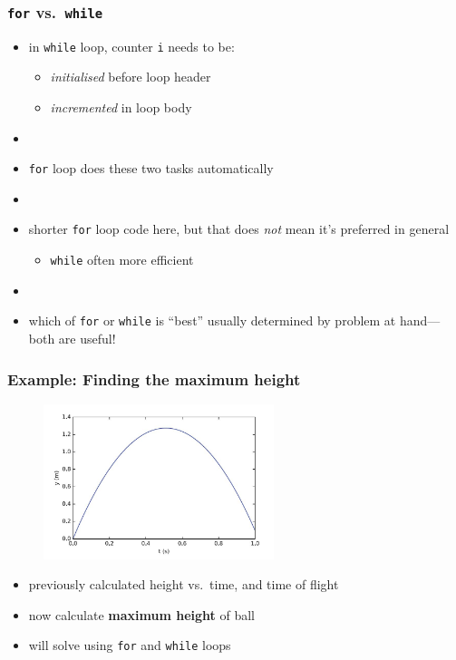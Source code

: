\documentclass[english,14pt]{beamer}
\begin{document}

\begin{frame}[fragile]

\frametitle{ \texttt{for} vs.~\texttt{while}}

\begin{itemize}
	\item in \texttt{while} loop, counter \texttt{i} needs to be:
	\begin{itemize}
		\item \emph{initialised} before loop header
		\item \emph{incremented} in loop body
	\end{itemize}
	\item[]
	\item \texttt{for} loop does these two tasks automatically
	\item[]
	\item shorter \texttt{for} loop code here, but that does \emph{not} mean it's preferred in general
	\begin{itemize}
		\item \texttt{while} often more efficient
	\end{itemize}
	\item[]	
	\item which of \texttt{for} or \texttt{while} is ``best'' usually determined by problem at hand---both are useful!
\end{itemize}

\end{frame}


\begin{frame}[fragile]

\frametitle{Example: Finding the maximum height}

\vspace*{-3mm}
\begin{figure}[ht]
	\centering
	\includegraphics[width=0.6\textwidth]{figures/LLp20c}
\end{figure}
\vspace*{-3mm}
\begin{itemize}
	\item previously calculated height vs.\ time, and time of flight
	\item now calculate \textbf{maximum height} of ball
	\item will solve using \texttt{for} and \texttt{while} loops
\end{itemize}

\end{frame}
\end{document}
